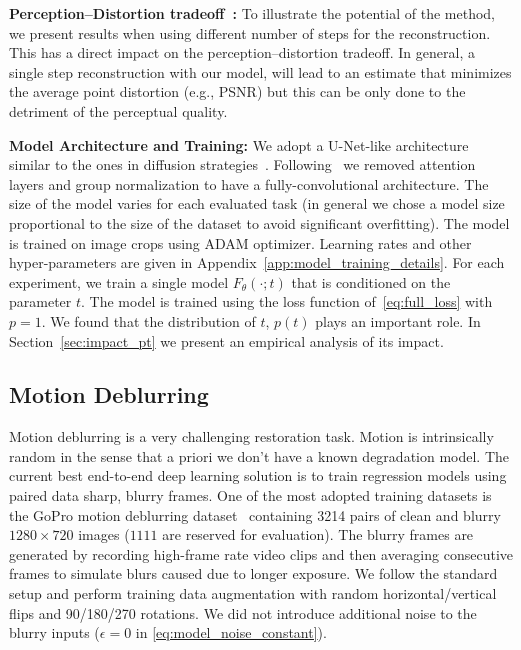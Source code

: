 \documentclass[10pt]{article} %
\begin{document}
\noindent \textbf{Perception--Distortion tradeoff~\citep{blau2018perception}:} To illustrate the potential of the method, we present results when using different number of steps for the reconstruction. This has a direct impact on the perception--distortion tradeoff. In general, a single step reconstruction with our model, will lead to an estimate that minimizes the average point distortion (e.g., PSNR) but this can be only done to the detriment of the perceptual quality.  


\noindent \textbf{Model Architecture and Training:}
We adopt a U-Net-like architecture similar to the ones in diffusion strategies~\citep{saharia2021image,whang2022deblurring}. Following~\cite{whang2022deblurring} we removed attention layers and group normalization to have a fully-convolutional architecture. %
The size of the model varies for each evaluated task (in general we chose a model size proportional to the size of the dataset to avoid significant overfitting). The model is trained on image crops using ADAM optimizer. Learning rates and other hyper-parameters are given in Appendix~\ref{app:model_training_details}.
For each experiment, we train a single model $F_\theta(\cdot; t)$ that is conditioned on the parameter $t$. The model is trained using the loss function of~\eqref{eq:full_loss} with $p=1$. We found that the distribution of $t$, $p(t)$ plays an important role. In Section~\ref{sec:impact_pt} we present an empirical analysis of its impact.







\subsection{Motion Deblurring} 
Motion deblurring is a very challenging restoration task. Motion is intrinsically random in the sense that a priori we don't have a known degradation model. The current best end-to-end deep learning solution is to train regression models using paired data sharp, blurry frames. One of the most adopted training datasets is the GoPro motion deblurring dataset~\citep{nah2017deep} containing 3214 pairs of clean and blurry $1280 \times 720$ images ($1111$ are reserved for evaluation). The blurry frames are generated by recording high-frame rate video clips and then averaging consecutive frames to simulate blurs caused due to longer exposure. We follow the standard setup \citep{nah2017deep,kupyn2019deblurgan,chen2021hinet,cho2021rethinking,suin2020spatially,zhang2019deep} and perform training data augmentation with random horizontal/vertical flips and 90/180/270 rotations. We did not introduce additional noise to the blurry inputs ($\epsilon =0$ in \eqref{eq:model_noise_constant}).
\end{document}
